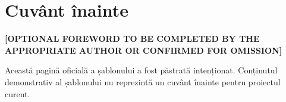 \chapter*{Cuvânt înainte}

\textbf{[OPTIONAL FOREWORD TO BE COMPLETED BY THE APPROPRIATE AUTHOR OR CONFIRMED FOR OMISSION]}

Această pagină oficială a șablonului a fost păstrată intenționat. Conținutul demonstrativ al șablonului nu reprezintă un cuvânt înainte pentru proiectul curent.

